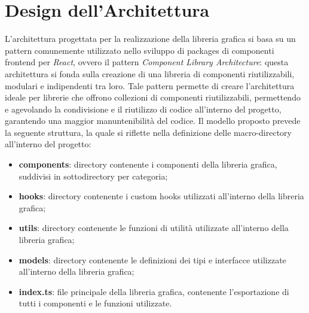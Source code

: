 \section{Design dell'Architettura}
L'architettura progettata per la realizzazione della libreria grafica si basa su un pattern comunemente utilizzato nello sviluppo di packages
di componenti frontend per \textit{React}, ovvero il pattern \textit{Component Library Architecture}: questa architettura si fonda sulla creazione di una libreria di
componenti riutilizzabili, modulari e indipendenti tra loro. \newline
Tale pattern permette di creare l'architettura ideale per librerie che offrono collezioni di componenti riutilizzabili, permettendo e agevolando
la condivisione e il riutilizzo di codice all'interno del progetto, garantendo una maggior manuntenibilità del codice. \newline
Il modello proposto prevede la seguente struttura, la quale si riflette nella definizione delle macro-directory all'interno del progetto:
\begin{itemize}
      \item \textbf{components}: directory contenente i componenti della libreria grafica, suddivisi in sottodirectory per categoria;
      \item \textbf{hooks}: directory contenente i custom hooks utilizzati all'interno della libreria grafica;
      \item \textbf{utils}: directory contenente le funzioni di utilità utilizzate all'interno della libreria grafica;
      \item \textbf{models}: directory contenente le definizioni dei tipi e interfacce utilizzate all'interno della libreria grafica;
      \item \textbf{index.ts}: file principale della libreria grafica, contenente l'esportazione di tutti i componenti e le funzioni utilizzate.
\end{itemize}


